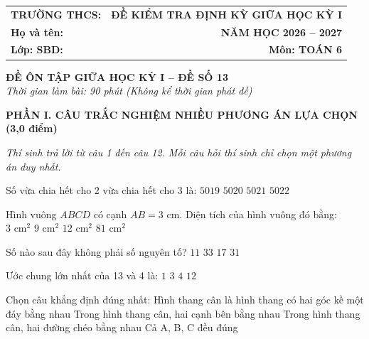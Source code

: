 \documentclass[12pt,a4paper]{article}
\begin{document}
\noindent
\begin{tabularx}{\linewidth}{X r}
\textbf{TRƯỜNG THCS: \dotfill} & \textbf{ĐỀ KIỂM TRA ĐỊNH KỲ GIỮA HỌC KỲ I} \\
\textbf{Họ và tên: \dotfill} & \textbf{NĂM HỌC 2026 -- 2027} \\
\textbf{Lớp: \dotfill \quad SBD: \dotfill} & \textbf{Môn: TOÁN 6} \\
\hline
\end{tabularx}
\vspace{2mm}

\begin{center}
  \textbf{\large ĐỀ ÔN TẬP GIỮA HỌC KỲ I -- ĐỀ SỐ 13}\\
  \textit{Thời gian làm bài: 90 phút (Không kể thời gian phát đề)}
\end{center}
\vspace{1mm}

\noindent\textbf{\large PHẦN I. CÂU TRẮC NGHIỆM NHIỀU PHƯƠNG ÁN LỰA CHỌN (3,0 điểm)}

\textit{Thí sinh trả lời từ câu 1 đến câu 12. Mỗi câu hỏi thí sinh chỉ chọn một phương án duy nhất.}

\vspace{1mm}
\begin{ex}
Số vừa chia hết cho 2 vừa chia hết cho 3 là:
\choice
{$5019$}
{$5020$}
{$5021$}
{\True $5022$}
\end{ex}

\begin{ex}
Hình vuông $ABCD$ có cạnh $AB = 3\text{ cm}$. Diện tích của hình vuông đó bằng:
\choice
{$3\text{ cm}^2$}
{\True $9\text{ cm}^2$}
{$12\text{ cm}^2$}
{$81\text{ cm}^2$}
\end{ex}

\begin{ex}
Số nào sau đây không phải số nguyên tố?
\choice
{$11$}
{\True $33$}
{$17$}
{$31$}
\end{ex}

\begin{ex}
Ước chung lớn nhất của 13 và 4 là:
\choice
{\True $1$}
{$3$}
{$4$}
{$12$}
\end{ex}

\begin{ex}
Chọn câu khẳng định đúng nhất:
\choice
{Hình thang cân là hình thang có hai góc kề một đáy bằng nhau}
{Trong hình thang cân, hai cạnh bên bằng nhau}
{Trong hình thang cân, hai đường chéo bằng nhau}
{\True Cả A, B, C đều đúng}
\end{ex}
\end{document}
